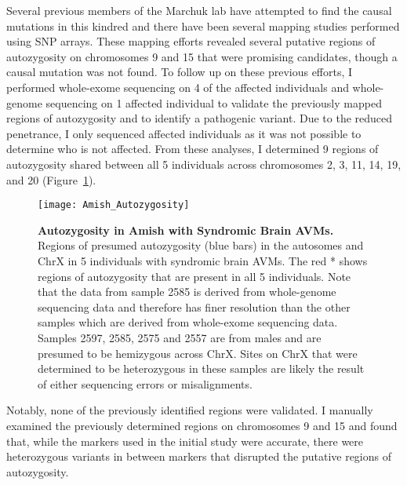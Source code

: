 Several previous members of the Marchuk lab have attempted to find the causal mutations in this kindred and there have been several mapping studies performed using SNP arrays. These mapping efforts revealed several putative regions of autozygosity on chromosomes 9 and 15 that were promising candidates, though a causal mutation was not found. To follow up on these previous efforts, I performed whole-exome sequencing on 4 of the affected individuals and whole-genome sequencing on 1 affected individual to validate the previously mapped regions of autozygosity and to identify a pathogenic variant. Due to the reduced penetrance, I only sequenced affected individuals as it was not possible to determine who is not affected. From these analyses, I determined 9 regions of autozygosity shared between all 5 individuals across chromosomes 2, 3, 11, 14, 19, and 20 (Figure~\ref{Amish_Autozygosity}).
\begin{figure}[tbp!]
\begin{center}
\texttt{[image: Amish\_Autozygosity]}
\end{center}
\caption[Autozygosity in Amish with Syndromic Brain AVMs]{\textbf{Autozygosity in Amish with Syndromic Brain AVMs.} \\ Regions of presumed autozygosity (blue bars) in the autosomes and ChrX in 5 individuals with syndromic brain AVMs. The red * shows regions of autozygosity that are present in all 5 individuals. Note that the data from sample 2585 is derived from whole-genome sequencing data and therefore has finer resolution than the other samples which are derived from whole-exome sequencing data. Samples 2597, 2585, 2575 and 2557 are from males and are presumed to be hemizygous across ChrX. Sites on ChrX that were determined to be heterozygous in these samples are likely the result of either sequencing errors or misalignments.}
\label{Amish_Autozygosity}
\end{figure}
 Notably, none of the previously identified regions were validated. I manually examined the previously determined regions on chromosomes 9 and 15 and found that, while the markers used in the initial study were accurate, there were heterozygous variants in between markers that disrupted the putative regions of autozygosity. 

